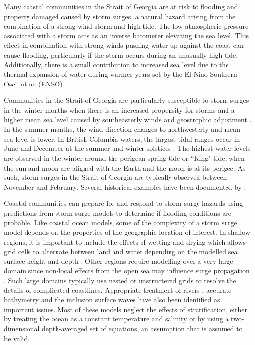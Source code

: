 \documentclass[pdftex,10pt]{article}
\begin{document}
Many coastal communities in the Strait of Georgia are at risk to flooding and property damaged caused by storm surges, a natural hazard arising from the combination of a strong wind storm and high tide. The low atmospheric pressure associated with a storm acts as an inverse barometer elevating the sea level. This effect in combination with strong winds pushing water up against the coast can cause flooding, particularly if the storm occurs during an unusually high tide.  Additionally, there is a small contribution to increased sea level due to the thermal expansion of water during warmer years set by the El Nino Southern Oscillation (ENSO) \citep{abeys2011extreme}.

Communities in the Strait of Georgia are particularly susceptible to storm surges in the winter months when there is an increased propensity for storms and a higher mean sea level caused by southeasterly winds and geostrophic adjustment \citep{danard2003storm}. In the summer months, the wind direction changes to northwesterly and mean sea level is lower. In British Columbia waters, the largest tidal ranges occur in June and December at the summer and winter solstices \citep{thomson1981oceanography}. The highest water levels are observed in the winter around the perigean spring tide or ``King" tide, when the sun and moon are aligned with the Earth and the moon is at its perigee. As such, storm surges in the Strait of Georgia are typically observed between November and February. Several historical examples have been documented by \citet{forseth2006adaptation}. 

Coastal communities can prepare for and respond to storm surge hazards using predictions from storm surge models to determine if flooding conditions are probable. Like coastal ocean models, some of the complexity of a storm surge model depends on the properties of the geographic location of interest. In shallow regions, it is important to include the effects of wetting and drying which allows grid cells to alternate between land and water depending on the modelled sea surface height and depth \citep{hubbert1999storm, weisberg2006hurricane}.  Other regions require modelling over a very large domain since non-local effects from the open sea may influence surge propagation \citep{weisberg2006hurricane, lane2009verification}. Such large domains typically use nested or unstructered grids to resolve the details of complicated coastlines. Appropriate treatment of rivers \citep{flather1994storm}, accurate bathymetry and the inclusion surface waves \citep{xu2010storm} have also been identified as important issues.  Most of these models neglect the effects of stratification, either by treating the ocean as a constant temperature and salinity or by using a two-dimensional depth-averaged set of equations, an assumption that is assumed to be valid. 
\end{document}
